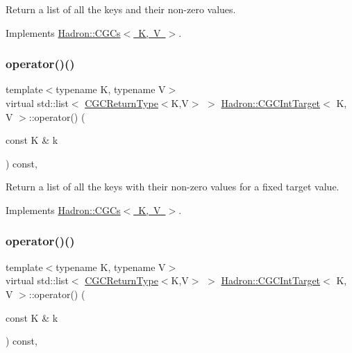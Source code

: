 Return a list of all the keys and their non-\/zero values. 



Implements \mbox{\hyperlink{classHadron_1_1CGCs_ac709374b31c0319e82028b9d7c23e993}{Hadron\+::\+C\+G\+Cs$<$ K, V $>$}}.

\mbox{\label{classHadron_1_1CGCIntTarget_a5946627ddb796961b97b7e0c57e32d83}} 
\subsubsection{\texorpdfstring{operator()()}{operator()()}\hspace{0.1cm}{\footnotesize\ttfamily [4/6]}}
{\footnotesize\ttfamily template$<$typename K, typename V$>$ \\
virtual std\+::list$<$ \mbox{\hyperlink{structHadron_1_1CGCReturnType}{C\+G\+C\+Return\+Type}}$<$K,V$>$ $>$ \mbox{\hyperlink{classHadron_1_1CGCIntTarget}{Hadron\+::\+C\+G\+C\+Int\+Target}}$<$ K, V $>$\+::operator() (\begin{DoxyParamCaption}\item[{const K \&}]{k }\end{DoxyParamCaption}) const\hspace{0.3cm}{\ttfamily [inline]}, {\ttfamily [virtual]}}



Return a list of all the keys with their non-\/zero values for a fixed target value. 



Implements \mbox{\hyperlink{classHadron_1_1CGCs_a8d2d80be37b603359708ebdd5923ff47}{Hadron\+::\+C\+G\+Cs$<$ K, V $>$}}.

\mbox{\label{classHadron_1_1CGCIntTarget_a5946627ddb796961b97b7e0c57e32d83}} 
\subsubsection{\texorpdfstring{operator()()}{operator()()}\hspace{0.1cm}{\footnotesize\ttfamily [5/6]}}
{\footnotesize\ttfamily template$<$typename K, typename V$>$ \\
virtual std\+::list$<$ \mbox{\hyperlink{structHadron_1_1CGCReturnType}{C\+G\+C\+Return\+Type}}$<$K,V$>$ $>$ \mbox{\hyperlink{classHadron_1_1CGCIntTarget}{Hadron\+::\+C\+G\+C\+Int\+Target}}$<$ K, V $>$\+::operator() (\begin{DoxyParamCaption}\item[{const K \&}]{k }\end{DoxyParamCaption}) const\hspace{0.3cm}{\ttfamily [inline]}, {\ttfamily [virtual]}}



